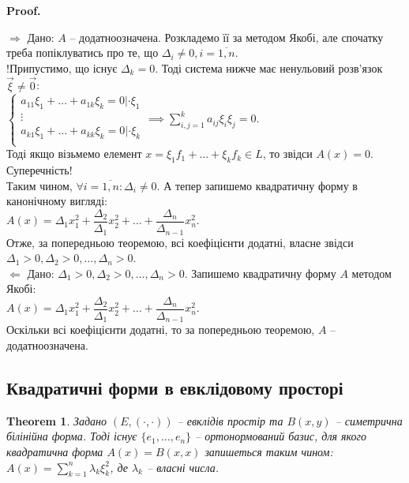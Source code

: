 \documentclass[a4paper, 10pt]{article}
\makeatletter
\def\rightproof{$\boxed{\Rightarrow}$ }
\def\leftproof{$\boxed{\Leftarrow}$ }
\theoremstyle{theoremdd}
\newtheorem{theorem}{Theorem}[subsection]
\renewenvironment{proof}[1][Proof.\\]{\par
\pushQED{\hfill \qed}%
\normalfont \topsep6\p@\@plus6\p@\relax
\trivlist
\item\relax
{\bfseries
#1\@addpunct{.}}\hspace\labelsep\ignorespaces
}{%
\popQED\endtrivlist\@endpefalse
}
\makeatother
\begin{document}
\begin{proof}
\rightproof Дано: $A$ -- додатноозначена. Розкладемо її за методом Якобі, але спочатку треба попіклуватись про те, що $\Delta_i \neq 0, i = \overline{1,n}$.\\
!Припустимо, що існує $\Delta_k = 0$. Тоді система нижче має ненульовий розв'язок $\vec{\xi} \neq \vec{0}$:\\
$\begin{cases}
a_{11}\xi_1 + \dots + a_{1k}\xi_k = 0 | \cdot \xi_1 \\
\vdots \\
a_{k1}\xi_1 + \dots + a_{kk}\xi_k = 0 | \cdot \xi_k \\
\end{cases} \implies \displaystyle\sum_{i,j=1}^k a_{ij}\xi_i \xi_j = 0$.\\
Тоді якщо візьмемо елемент $x = \xi_1 f_1 + \dots + \xi_k f_k \in L$, то звідси $A(x) = 0$. Суперечність!\\
Таким чином, $\forall i=\overline{1,n}: \Delta_i \neq 0$. А тепер запишемо квадратичну форму в канонічному вигляді:\\
$A(x) = \Delta_1 x_1^2 + \dfrac{\Delta_2}{\Delta_1} x_2^2 + \dots + \dfrac{\Delta_n}{\Delta_{n-1}} x_n^2$.\\
Отже, за попередньою теоремою, всі коефіцієнти додатні, власне звідси $\Delta_1>0,\Delta_2>0,\dots,\Delta_n>0$.
\bigskip \\
\leftproof Дано: $\Delta_1>0,\Delta_2>0,\dots,\Delta_n>0$. Запишемо квадратичну форму $A$ методом Якобі:\\
$A(x) = \Delta_1 x_1^2 + \dfrac{\Delta_2}{\Delta_1} x_2^2 + \dots + \dfrac{\Delta_n}{\Delta_{n-1}} x_n^2$.\\
Оскільки всі коефіцієнти додатні, то за попередньою теоремою, $A$ -- додатноозначена.
\end{proof}

\subsection{Квадратичні форми в евклідовому просторі}
\begin{theorem}
Задано $(E,(\cdot,\cdot))$ -- евклідів простір та $B(x,y)$ -- симетрична білінійна форма. Тоді існує $\{e_1,\dots,e_n\}$ -- ортонормований базис, для якого квадратична форма $A(x) = B(x,x)$ запишеться таким чином:\\
$A(x) = \displaystyle\sum_{k=1}^n \lambda_k \xi_k^2$, де $\lambda_k$ -- власні числа.
\end{theorem}
\end{document}
